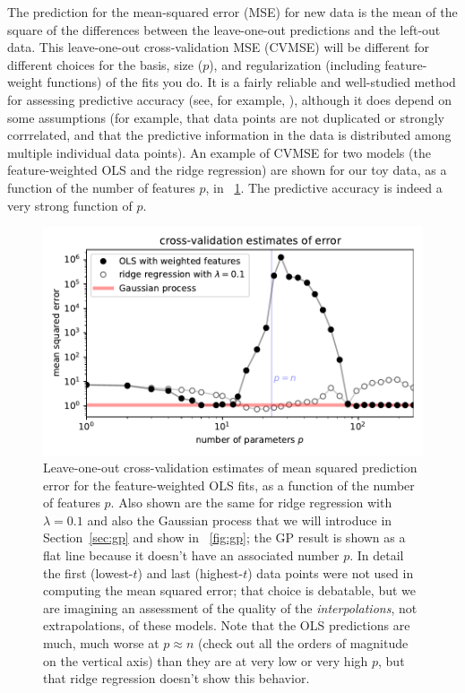 \documentclass[12pt,letterpaper]{article}
\newlength{\figurewidth}
\newcommand{\sectionname}{Section}
\begin{document}
The prediction for the mean-squared error (MSE) for new data is the mean of the square of the differences between the leave-one-out predictions and the left-out data.
This leave-one-out cross-validation MSE (CVMSE) will be different for different choices for the basis, size ($p$), and regularization (including feature-weight functions) of the fits you do.
It is a fairly reliable and well-studied method for assessing predictive accuracy (see, for example, \citealt{cv}), although it does depend on some assumptions (for example, that data points are not duplicated or strongly corrrelated, and that the predictive information in the data is distributed among multiple individual data points).
An example of CVMSE for two models (the feature-weighted OLS and the ridge regression) are shown for our toy data, as a function of the number of features $p$, in \figurename~\ref{fig:cv}.
The predictive accuracy is indeed a very strong function of $p$.
\begin{figure}[t]
    \begin{mdframed}
    \includegraphics[width=\figurewidth]{./cross-validation.pdf}
    \caption{Leave-one-out cross-validation estimates of mean squared prediction error for the feature-weighted OLS fits, as a function of the number of features $p$. Also shown are the same for ridge regression with $\lambda=0.1$ and also the Gaussian process that we will introduce in \sectionname~\ref{sec:gp} and show in \figurename~\ref{fig:gp}; the GP result is shown as a flat line because it doesn't have an associated number $p$. In detail the first (lowest-$t$) and last (highest-$t$) data points were not used in computing the mean squared error; that choice is debatable, but we are imagining an assessment of the quality of the \emph{interpolations}, not extrapolations, of these models. Note that the OLS predictions are much, much worse at $p\approx n$ (check out all the orders of magnitude on the vertical axis) than they are at very low or very high $p$, but that ridge regression doesn't show this behavior.}
    \label{fig:cv}
    \end{mdframed}
\end{figure}
\end{document}
